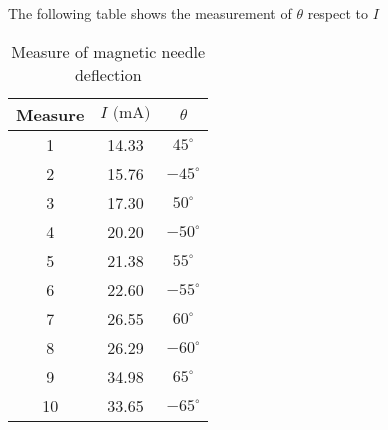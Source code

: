 The following table shows the measurement of $\theta$ respect to $I$
\begin{table}[!htbp]
    {\par\centering
    \begin{tabular}{ccc}
        \hline
        Measure & $I \text{ (mA)}$ & $\theta$ \\
        \hline
        1   &    14.33&    $45^{\circ}$\\
        2   &    15.76&   $-45^{\circ}$\\
        3   &    17.30&   $ 50^{\circ}$\\
        4   &    20.20&   $-50^{\circ}$\\
        5   &    21.38&   $ 55^{\circ}$\\
        6   &    22.60&   $-55^{\circ}$\\
        7   &    26.55&   $ 60^{\circ}$\\
        8   &    26.29&   $-60^{\circ}$\\
        9   &    34.98&   $ 65^{\circ}$\\
        10  &    33.65&   $-65^{\circ}$\\
        \hline
    \end{tabular}
    \par}
    \caption{Measure of magnetic needle deflection}
\end{table}
